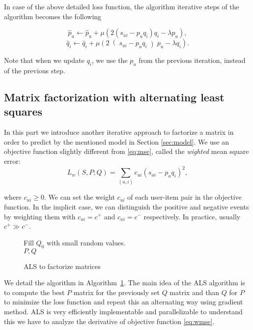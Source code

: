 In case of the above detailed loss function, the algorithm iterative steps of the algorithm 
becomes the following

\[ \hat{p}_{u}\leftarrow \hat{p}_{u}+\mu \left(2\left(s_{ui}-p_u q_i\right) q_i - \lambda p_u\right),\]
\[\hat{q}_{i}\leftarrow \hat{q}_{i}+\mu \left(2\right(s_{ui}-p_u q_i\left)p_u - \lambda q_i\right) .\]

Note that when we update $q_i$, we use the $p_u$ from the previous iteration, instead of
the previous step.



\subsection{Matrix factorization with alternating least squares}

In this part we introduce another iterative approach to factorize a matrix in order to predict by
the mentioned model in Section \ref{sec:model}. We use an objective function slightly different
from \eqref{eq:mse}, called the \emph{wighted} mean square error:
\begin{equation} \label{eq:wmse}
   L_{w}(S,P;Q)=\sum_{(u,i)}c_{ui}(s_{ui}-p_{u}q_{i})^2, 
\end{equation}

where $c_{ui}\geq0$. We can set the weight  $c_{ui}$ of each user-item pair in the objective function.
In the implicit case, we can distinguish the positive and negative events by weighting them with $c_{ui}=c^+$ and $c_{ui}=c^-$ respectively. In practice, usually $c^{+} \gg c^{-}$. 

\begin{figure}[]
\begin{algorithm}[H]\label{alg:als}
    Fill $Q_0$ with small random values. \\
  \Return $P,Q$
  \caption{ALS to factorize matrices}
\end{algorithm}
\end{figure}

 We detail the algorithm \cite{takacs2012alternating} in Algorithm~\ref{alg:als}. The main idea
 of  the ALS algorithm is to compute the best $P$ matrix for the previously set $Q$ matrix  and
 than $Q$ for $P$ to minimize the loss function and repeat this an alternating way using gradient
 method. ALS is very efficiently implementable and parallelizable to understand this we have to analyze the derivative of objective function \eqref{eq:wmse}.

